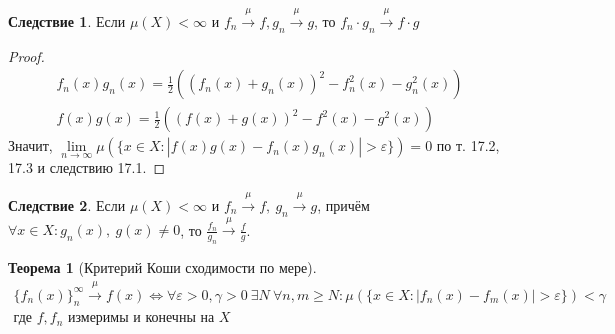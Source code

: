 \documentclass[11pt,a4paper]{report}
\def\eps{\varepsilon}
\theoremstyle{definition}
\theoremstyle{definition}
\newtheorem{theorem}{Теорема}[section]
\newtheorem{corollary}{Следствие}[section]
\theoremstyle{definition}
\begin{document}
		\begin{corollary}
			Если $ \mu(X) < \infty $ и $ f_{n} \xrightarrow{\mu} f, g_{n} \xrightarrow{\mu} g $, то $ f_{n} \cdot g_{n} \xrightarrow{\mu} f \cdot g $
		\end{corollary}
		\begin{proof}
			\begin{gather*}
				f_{n}(x) g_{n}(x) = \frac{1}{2}((f_{n}(x) + g_{n}(x))^{2} - f^{2}_{n}(x) - g^{2}_{n}(x))\\
				f(x) g(x) = \frac{1}{2}((f(x) + g(x))^{2} - f^{2}(x) - g^{2}(x))
			\end{gather*}
			Значит, $ \lim\limits_{n\to\infty}\mu(\{x \in X: |f(x)g(x) - f_{n}(x)g_{n}(x)| > \eps \}) = 0 $ по т. 17.2, 17.3 и следствию 17.1.
		\end{proof}
		\begin{corollary}
			Если $ \mu(X) < \infty $ и $ f_{n} \xrightarrow{\mu} f,\ g_{n} \xrightarrow{\mu} g $, причём $ \forall x \in X: g_{n}(x),\ g(x) \neq 0 $, то $ \frac{f_{n}}{g_{n}} \xrightarrow{\mu} \frac{f}{g} $.
		\end{corollary}
		\begin{theorem}[Критерий Коши сходимости по мере]$  $\\
			\begin{gather*}
				\{f_{n}(x)\}_{n}^{\infty} \xrightarrow{\mu} f(x) \iff \forall \eps > 0, \gamma > 0\ \exists N\ \forall n, m \ge N: \mu(\{ x \in X: |f_{n}(x) - f_{m}(x)| > \eps \}) < \gamma\\
				\mbox{где } f, f_{n} \mbox{ измеримы и конечны на } X
			\end{gather*}
		\end{theorem}
\end{document}
